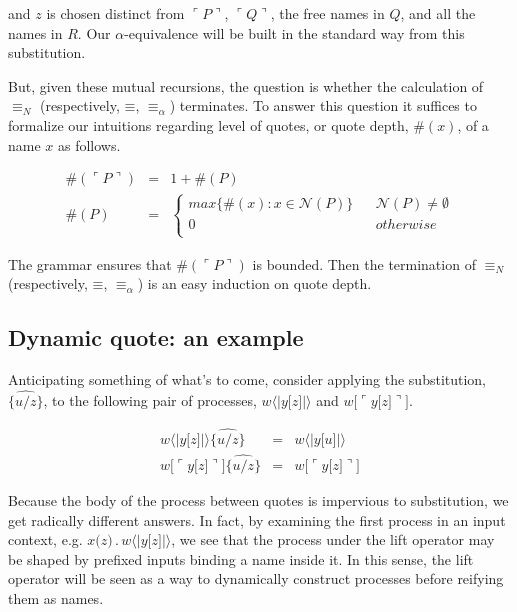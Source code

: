 \documentclass[]{amsart}
\newcommand{\lliftb}{\langle\!|}
\newcommand{\rliftb}{|\!\rangle}
\newcommand{\lpquote}{\ulcorner}
\newcommand{\rpquote}{\urcorner}
\newcommand{\id}[1]{\texttt{#1}}
\newcommand{\concat}{\mathbin{.}}
\newcommand{\scong}{\mathbin{\equiv}}
\newcommand{\nameeq}{\mathbin{\equiv_N}}
\newcommand{\alphaeq}{\mathbin{\equiv_{\alpha}}}
\newcommand{\names}[1]{\mathbin{\mathcal{N}(#1)}}
\newcommand{\lift}[2]{#1 \lliftb #2 \rliftb}
\newcommand{\quotep}[1]{\lpquote #1 \rpquote}
\theoremstyle{definition}
\theoremstyle{remark}
\numberwithin{equation}{subsection}
\begin{document}
and $z$ is chosen distinct from $\quotep{P}$, $\quotep{Q}$, the free
names in $Q$, and all the names in $R$. Our $\alpha$-equivalence will
be built in the standard way from this substitution.

But, given these mutual recursions, the question is whether the calculation
of $\nameeq$ (respectively, $\scong$, $\alphaeq$) terminates. To
answer this question it suffices to formalize our intuitions regarding
level of quotes, or quote depth, $\#(x)$, of a name $x$ as
follows.

\begin{eqnarray*}
	\#(\quotep{P}) & = & 1 + \#(P) \\
    \#(P) & = & \left\{
			   \begin{array}{ccc}
				 max\{ \#(x) : x \in \names{P} \} & & \names{P} \neq \emptyset \\
				 0 & & otherwise \\
			   \end{array}
			\right.
\end{eqnarray*}

The grammar ensures that $\#(\quotep{P})$ is bounded. Then the
termination of $\nameeq$ (respectively, $\scong$, $\alphaeq$) is an
easy induction on quote depth.

\subsection{ Dynamic quote: an example }

Anticipating something of what's to come, consider applying the
substitution, $\widehat{\id{\{}u / z \id{\}}}$, to the following pair
of processes, $\lift{w}{y \id{[}z\id{]}}$ and $w\id{[} \lpquote
y\id{[}z\id{]} \rpquote \id{]}$.

\begin{eqnarray*}
	\lift{w}{y \id{[}z\id{]}}\widehat{\id{\{}u / z \id{\}}}
		& = &
		\lift{w}{y \id{[}u\id{]}} \\
	w\id{[} \lpquote y\id{[}z\id{]} \rpquote \id{]} \widehat{ \id{\{}u / z \id{\}} }
		& = &
		w\id{[} \lpquote y\id{[}z\id{]} \rpquote \id{]}
\end{eqnarray*}

Because the body of the process between quotes is impervious to
substitution, we get radically different answers. In fact, by
examining the first process in an input context, e.g. $x \id{(} z
\id{)}\concat \lift{w}{y
\id{[}z\id{]}}$, we see that the process under the lift operator may
be shaped by prefixed inputs binding a name inside it. In this sense,
the lift operator will be seen as a way to dynamically construct
processes before reifying them as names.
\end{document}
